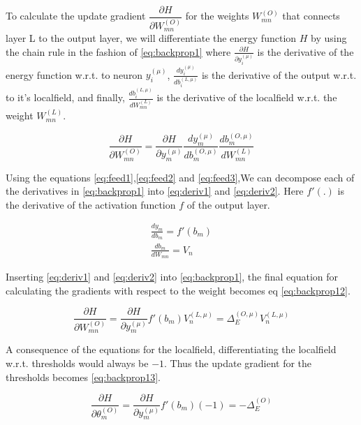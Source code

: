 To calculate the update gradient $\dfrac{\partial H}{\partial W^{(O)}_{mn}}$ for the weights $W^{(O)}_{mn}$ that connects layer L to the output layer, we will differentiate the energy function $H$ by using the chain rule in the fashion of \eqref{eq:backprop1} where $\frac{\partial H}{\partial y^{(\mu)}_i}$ is the derivative of the energy function w.r.t. to neuron $y^{(\mu)}_i$, $\frac{dy_i^{(\mu)}}{db^{(L,\mu)}_i}$ is the derivative of the output w.r.t. to it's localfield, and finally, $\frac{db_i^{(L,\mu)}}{dW^{(L)}_{mn}}$ is the derivative of the localfield w.r.t. the weight $W^{(L)}_{mn}$.

\begin{equation}
    \label{eq:backprop1}
    \frac{\partial H}{\partial W_{mn}^{(O)}} = \frac{\partial H}{\partial y^{(\mu)}_m}\frac{dy_m^{(\mu)}}{db^{(O,\mu)}_m}\frac{db_m^{(O,\mu)}}{dW^{(L)}_{mn}}
\end{equation}

Using the equations \eqref{eq:feed1},\eqref{eq:feed2} and \eqref{eq:feed3},We can decompose each of the derivatives in \eqref{eq:backprop1} into \eqref{eq:deriv1} and \eqref{eq:deriv2}. Here $f'(.)$ is the derivative of the activation function $f$ of the output layer.

\begin{align}
    \frac{dy_m}{db_m} = f'(b_m)\label{eq:deriv1} \\
    \frac{db_m}{dW_{mn}} = V_n \label{eq:deriv2}
\end{align}

Inserting \eqref{eq:deriv1} and \eqref{eq:deriv2} into \eqref{eq:backprop1}, the final equation for calculating the gradients with respect to the weight becomes eq \eqref{eq:backprop12}.

\begin{equation}
    \label{eq:backprop12}
    \frac{\partial H}{\partial W_{mn}^{(O)}} = \frac{\partial H}{\partial y_m^{(\mu)}}f'(b_m)V^{(L,\mu)}_n = \Delta_E^{(O,\mu)}V^{(L,\mu)}_n
\end{equation}

A consequence of the equations for the localfield, differentiating the localfield w.r.t. thresholds would always be $-1$. Thus the update gradient for the thresholds becomes \eqref{eq:backprop13}.

\begin{equation}
    \label{eq:backprop13}
    \frac{\partial H}{\partial \theta^{(O)}_m} = \frac{\partial H}{\partial y_m^{(\mu)}}f'(b_m)(-1) = -\Delta_E^{(O)}
\end{equation}


